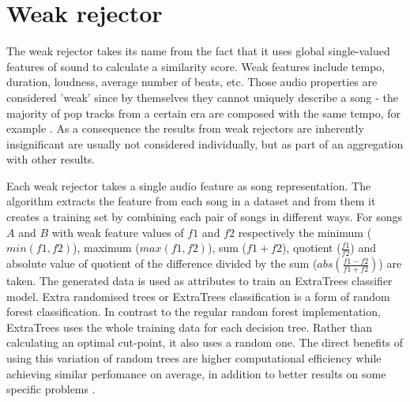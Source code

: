 \section{Weak rejector} 
\label{sec:osmalskyj}

The weak rejector takes its name from the fact that it uses global single-valued
features of sound to calculate a similarity score. Weak features include tempo,
duration, loudness, average number of beats, etc. Those audio properties are
considered 'weak' since by themselves they cannot uniquely describe a song - the
majority of pop tracks from a certain era are composed with the same tempo, for
example \cite{slowpop}. As a consequence the results from weak rejectors are
inherently insignificant are usually not considered individually, but as
part of an aggregation with other results.

Each weak rejector takes a single audio feature as song representation. The
algorithm extracts the feature from each song in a dataset and from them it
creates a training set by combining each pair of songs in different ways. For
songs $A$ and $B$ with weak feature values of $f1$ and $f2$ respectively the
minimum ($min(f1, f2)$), maximum ($max(f1, f2)$), sum ($f1 + f2$), quotient
($\frac{f1}{f2}$) and absolute value of quotient of the difference divided by
the sum ($abs(\frac{f1 - f2}{f1 + f2})$) are taken. The generated data is used
as attributes to train an ExtraTrees classifier model. Extra randomised trees or
ExtraTrees classification is a form of random forest classification. In
contrast to the regular random forest implementation, ExtraTrees uses the whole
training data for each decision tree. Rather than calculating an optimal
cut-point, it also uses a random one. The direct benefits of using this
variation of random trees are higher computational efficiency while achieving
similar perfomance on average, in addition to better results on some specific
problems \cite{geurts2006extremely}.

